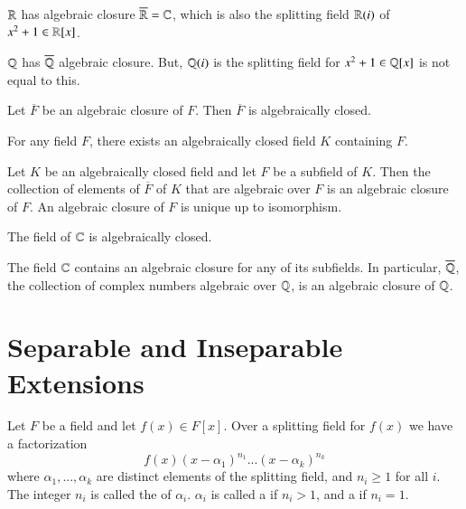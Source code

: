 \begin{example}
    $\mathbb R$ has algebraic closure $\overline{\mathbb R} = \mathbb C$, which is also the splitting field $\mathbb R(i)$ of $x^2+1 \in \mathbb R[x]$.
\end{example}

\begin{example}
    $\mathbb Q$ has $\overline{\mathbb Q}$ algebraic closure. But, $\mathbb Q(i)$ is the splitting field for $x^2+1 \in \mathbb Q[x]$ is not equal to this.
\end{example}

\begin{proposition}
    Let $\overline{F}$ be an algebraic closure of $F$. Then $\overline{F}$ is algebraically closed.
\end{proposition}

\begin{proposition}
    For any field $F$, there exists an algebraically closed field $K$ containing $F$.
\end{proposition}

\begin{proposition}
    Let $K$ be an algebraically closed field and let $F$ be a subfield of $K$. Then the collection of elements of $\overline{F}$ of $K$ that are algebraic over $F$ is an algebraic closure of $F$. An algebraic closure of $F$ is unique up to isomorphism.
\end{proposition}


\begin{theorem}
    The field of $\mathbb C$ is algebraically closed.
\end{theorem}

\begin{corollary}
    The field $\mathbb C$ contains an algebraic closure for any of its subfields. In particular, $\overline{\mathbb Q}$, the collection of complex numbers algebraic over $\mathbb Q$, is an algebraic closure of $\mathbb Q$.
\end{corollary}



\section{ Separable and Inseparable Extensions}

Let $F$ be a field and let $f(x) \in F[x]$. Over a splitting field for $f(x)$ we have a factorization \begin{equation*}
    f(x) (x-\alpha_1)^{n_1}...(x-\alpha_k)^{n_k}
\end{equation*}
where $\alpha_1,...,\alpha_k$ are distinct elements of the splitting field, and $n_i \geq 1$ for all $i$. The integer $n_i$ is called the  of $\alpha_i$. $\alpha_i$ is called a  if $n_i >1$, and a  if $n_i =1$.


